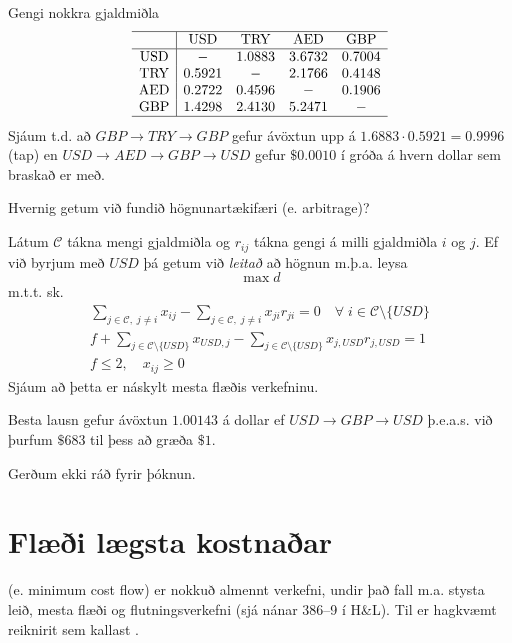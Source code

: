 \begin{daemi}[Gjaldeyrisbrask]Gengi nokkra gjaldmiðla
\[\begin{array}{c|cccc}\hline 
   &       \mbox{USD} & \mbox{TRY} & \mbox{AED} & \mbox{GBP} \\ \hline 
\mbox{USD} &-& 1.0883 & 3.6732 & 0.7004\\
\mbox{TRY} & 0.5921 &-& 2.1766 & 0.4148\\
\mbox{AED} &0.2722 & 0.4596 &-& 0.1906\\
\mbox{GBP} &1.4298 & 2.4130 & 5.2471 &-\\ \hline 
  \end{array}\]
Sjáum t.d. að $GBP\to TRY\to GBP$ gefur ávöxtun upp á $1.6883\cdot 0.5921=0.9996$ (tap) en $USD\to AED\to GBP\to USD$ gefur $\$0.0010$ í gróða á hvern dollar sem braskað er með.

Hvernig getum við fundið högnunartækifæri (e. arbitrage)?
\end{daemi}
\begin{lausn}
Látum $\mathcal{C}$ tákna mengi gjaldmiðla og $r_{ij}$ tákna gengi á milli gjaldmiðla $i$ og $j$. Ef við byrjum með $USD$ þá getum við \emph{leitað} að högnun m.þ.a. leysa
$$ \max d$$
m.t.t. sk.
\begin{eqnarray*}
 \sum_{j\in\mathcal{C},\;j\neq i} x_{ij}-\sum_{j\in\mathcal{C},\;j\neq i} x_{ji}r_{ji} = 0\quad\forall\;i\in\mathcal{C}\setminus\{USD\} \\
 f+\sum_{j\in\mathcal{C}\setminus\{USD\}} x_{USD,j}-\sum_{j\in\mathcal{C}\setminus\{USD\}} x_{j,USD}r_{j,USD}=1\\
f\leq 2,\quad x_{ij}\geq 0
\end{eqnarray*}
Sjáum að þetta er náskylt mesta flæðis verkefninu.

Besta lausn gefur ávöxtun $1.00143$ á dollar ef $USD\to GBP\to USD$ þ.e.a.s. við þurfum $\$683$ til þess að græða $\$1$.
\begin{aths}Gerðum ekki ráð fyrir þóknun.\end{aths}

\end{lausn}



\section{Flæði lægsta kostnaðar}
 (e. minimum cost flow) er nokkuð almennt verkefni, undir það fall m.a. stysta leið, mesta flæði og flutningsverkefni (sjá nánar 386--9 í H\&L). Til er hagkvæmt reiknirit sem kallast .

